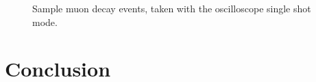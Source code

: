 \documentclass[%
 aip,
 amsmath,amssymb,
 reprint,%
floatfix,
]{revtex4-1}
\begin{document}
\begin{figure}[H]
	\centering
	\hfill
	\hfill
	\caption{Sample muon decay events, taken with the oscilloscope single shot mode.}
\end{figure}

\section{\label{sec:level5}Conclusion}


\nocite{*}
\end{document}
